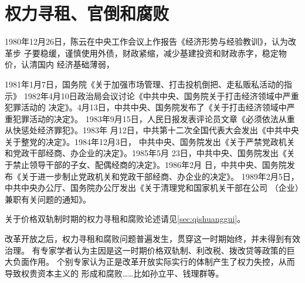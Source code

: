 \section{权力寻租、官倒和腐败}

1980年12月26日，陈云在中央工作会议上作报告《经济形势与经验教训》，认为改革步
子要稳缓，谨慎使用外债，财政紧缩，减少基建投资和财政赤字，稳定物价，认清国内
经济基础薄弱，

1981年1月7日，国务院《关于加强市场管理、打击投机倒把、走私贩私活动的指示》
1982年4月10日政治局会议讨论《中共中央、国务院关于打击经济领域中严重犯罪活动的
决定》。4月13日，中共中央、国务院发布了《关于打击经济领域中严重犯罪活动的决定》。
1983年9月15日，人民日报发表评论员文章《必须依法从重从快惩处经济罪犯》。1983年
月12日，中共第十二次全国代表大会发出《中共中央关于整党的决定》。1984年12月3日，
中共中央、国务院发出《关于严禁党政机关和党政干部经商、办企业的决定》。1985年5月
23日，中共中央、国务院发出《关于禁止领导干部的子女、配偶经商的决定》。1986年2月
日，中共中央、国务院发布《关于进一步制止党政机关和党政干部经商、办企业的决定》。
1989年2月5日，中共中央办公厅、国务院办公厅发出《关于清理党和国家机关干部在公司
（企业）兼职有关问题的通知》。

关于价格双轨制时期的权力寻租和腐败论述请见\cref{sec:qishuanggui}。


改革开放之后，权力寻租和腐败问题普遍发生，贯穿这一时期始终，并未得到有效治理。
有专家学者认为主因是这一时期价格双轨制、利改税、拨改贷等政策的巨大负面作用。
个别专家认为正是改革开放实际实行的体制产生了权力失控，从而导致权贵资本主义的
形成和腐败……比如孙立平\cite{sunlipingkuibai}、钱理群\cite{maohehoumao2}等。







